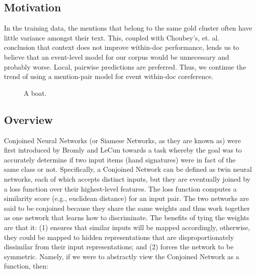 \documentclass[11pt,a4paper]{article}
\begin{document}
\subsection{Motivation}
In the training data, the mentions that belong to the same gold cluster often have little variance amongst their text.  This, coupled with Choubey's, et. al.  conclusion that context does not improve within-doc performance, lends us to believe that an event-level model for our corpus would be unnecessary and probably worse.  Local, pairwise predictions are preferred. Thus, we continue the trend of using a mention-pair model for event within-doc coreference.
\begin{figure}
  \caption{A boat.}
  \label{fig:lemmaPower}
\end{figure}
\subsection{Overview}
Conjoined Neural Networks (or Siamese Networks, as they are known as) were first introduced by Bromly and LeCun  towards a task whereby the goal was to accurately determine if two input items (hand signatures) were in fact of the same class or not.  Specifically, a Conjoined Network can be defined as twin neural networks, each of which accepts distinct inputs, but they are eventually joined by a loss function over their highest-level features.  The loss function computes a similarity score (e.g., euclidean distance) for an input pair.  The two networks are said to be conjoined because they share the same weights and thus work together as one network that learns how to discriminate.  The benefits of tying the weights are that it: (1) ensures that similar inputs will be mapped accordingly, otherwise, they could be mapped to hidden representations that are disproportionately dissimilar from their input representations; and (2) forces the network to be symmetric.  Namely, if we were to abstractly view the Conjoined Network as a function, then:
\end{document}
